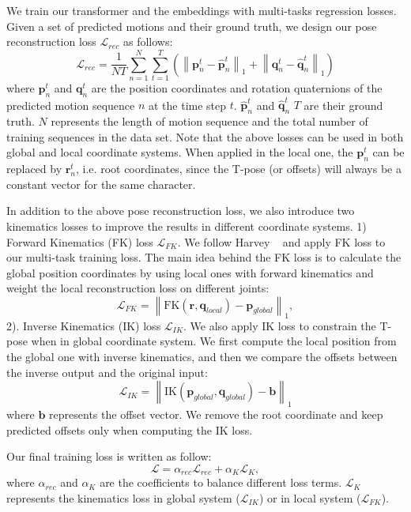 \documentclass[10pt,twocolumn,letterpaper]{article}
\newcommand{\norm}[1]{\left\lVert#1\right\rVert}
\begin{document}
We train our transformer and the embeddings with multi-tasks regression losses. Given a set of predicted motions and their ground truth, we design our pose reconstruction loss $\mathcal{L}_{rec}$ as follows:
\begin{equation}
        \mathcal{L}_{rec} = \frac{1}{NT}\sum_{n=1}^N \sum_{t=1}^T (\norm{\bm{p}_n^t - \hat{\bm{p}}_n^t}_1 + \norm{\bm{q}_n^t - \hat{\bm{q}}_n^t}_1)
\end{equation}
where $\bm{p}^t_n$ and $\bm{q}^t_n$ are the position coordinates and rotation quaternions of the predicted motion sequence $n$ at the time step $t$. $\hat{\bm{p}}^t_n$ and $\hat{\bm{q}}^t_n$ $T$ are their ground truth. $N$ represents the length of motion sequence and the total number of training sequences in the data set. Note that the above losses can be used in both global and local coordinate systems. When applied in the local one, the $\bm{p}_n^t$ can be replaced by $\bm{r}_n^t$, i.e. root coordinates, since the T-pose (or offsets) will always be a constant vector for the same character.

In addition to the above pose reconstruction loss, we also introduce two  kinematics losses to improve the results in different coordinate systems. 1) Forward Kinematics (FK) loss $\mathcal{L}_{FK}$. We follow Harvey \etal~\cite{harvey2020robust} and apply FK loss to our multi-task training loss. The main idea behind the FK loss is to calculate the global position coordinates by using local ones with forward kinematics and weight the local reconstruction loss on different joints:
\begin{equation}
    \mathcal{L}_{FK} = \norm{\text{FK}(\bm{r}, \bm{q}_{local}) - \bm{p}_{global}}_1,
\end{equation}
2). Inverse Kinematics (IK) loss $\mathcal{L}_{IK}$. We also apply IK loss to constrain the T-pose when in global coordinate system. We first compute the local position from the global one with inverse kinematics, and then we compare the offsets between the inverse output and the original input:
\begin{equation}
    \mathcal{L}_{IK} = \norm{\text{IK}(\bm{p}_{global}, \bm{q}_{global}) - \bm{b}}_1
\end{equation}
where $\bm{b}$ represents the offset vector. We remove the root coordinate and keep predicted offsets only when computing the IK loss.

Our final training loss is written as follow:
\begin{equation}
    \mathcal{L} = \alpha_{rec}\mathcal{L}_{rec} + \alpha_{K}\mathcal{L}_{K},
\end{equation}
where $\alpha_{rec}$ and $\alpha_{K}$ are the coefficients to balance different loss terms. $\mathcal{L}_{K}$ represents the kinematics loss in global system ($\mathcal{L}_{IK}$) or in local system ($\mathcal{L}_{FK}$).
\end{document}

